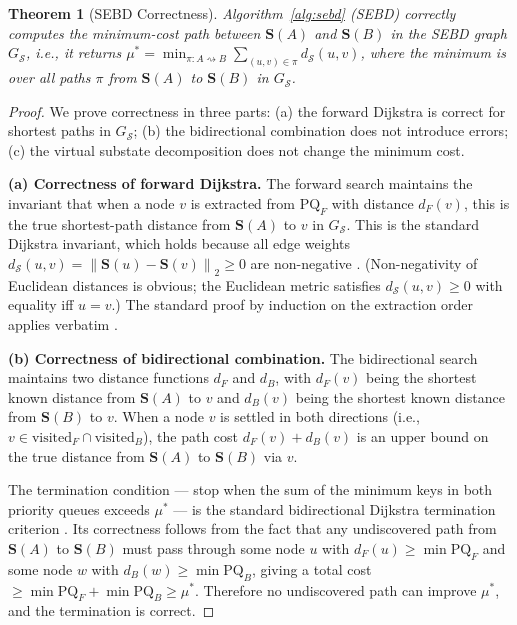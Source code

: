 \documentclass[twocolumn]{article}
\theoremstyle{plain}
\newtheorem{theorem}{Theorem}[section]
\theoremstyle{definition}
\newcommand{\SS}{\mathcal{S}}
\newcommand{\bS}{\mathbf{S}}
\newcommand{\dS}{d_{\mathcal{S}}}
\newcommand{\norm}[1]{\left\lVert #1 \right\rVert}
\begin{document}
\begin{theorem}[SEBD Correctness]
\label{thm:correctness}
Algorithm~\ref{alg:sebd} (SEBD) correctly computes the minimum-cost path between
$\bS(A)$ and $\bS(B)$ in the SEBD graph $G_\SS$, i.e., it returns
$\mu^* = \min_{\pi: A \rightsquigarrow B} \sum_{(u,v) \in \pi} \dS(u,v)$,
where the minimum is over all paths $\pi$ from $\bS(A)$ to $\bS(B)$ in $G_\SS$.
\end{theorem}

\begin{proof}
We prove correctness in three parts: (a) the forward Dijkstra is correct for
shortest paths in $G_\SS$; (b) the bidirectional combination does not introduce
errors; (c) the virtual substate decomposition does not change the minimum cost.

\textbf{(a) Correctness of forward Dijkstra.} The forward search maintains
the invariant that when a node $v$ is extracted from $\text{PQ}_F$ with distance
$d_F(v)$, this is the true shortest-path distance from $\bS(A)$ to $v$ in
$G_\SS$. This is the standard Dijkstra invariant, which holds because all edge
weights $\dS(u,v) = \norm{\bS(u) - \bS(v)}_2 \geq 0$ are non-negative
\cite{dijkstra1959note, cormen2009introduction}. (Non-negativity of Euclidean
distances is obvious; the Euclidean metric satisfies $\dS(u,v) \geq 0$ with
equality iff $u = v$.) The standard proof by induction on the extraction order
applies verbatim \cite{cormen2009introduction}.

\textbf{(b) Correctness of bidirectional combination.} The bidirectional
search maintains two distance functions $d_F$ and $d_B$, with $d_F(v)$ being
the shortest known distance from $\bS(A)$ to $v$ and $d_B(v)$ being the
shortest known distance from $\bS(B)$ to $v$. When a node $v$ is settled in
both directions (i.e., $v \in \text{visited}_F \cap \text{visited}_B$), the
path cost $d_F(v) + d_B(v)$ is an upper bound on the true distance from
$\bS(A)$ to $\bS(B)$ via $v$.

The termination condition --- stop when the sum of the minimum keys in both
priority queues exceeds $\mu^*$ --- is the standard bidirectional Dijkstra
termination criterion \cite{pohl1971bi}. Its correctness follows from the fact
that any undiscovered path from $\bS(A)$ to $\bS(B)$ must pass through some
node $u$ with $d_F(u) \geq \min \text{PQ}_F$ and some node $w$ with $d_B(w)
\geq \min \text{PQ}_B$, giving a total cost $\geq \min \text{PQ}_F + \min
\text{PQ}_B \geq \mu^*$. Therefore no undiscovered path can improve $\mu^*$,
and the termination is correct.


\end{proof}
\end{document}
